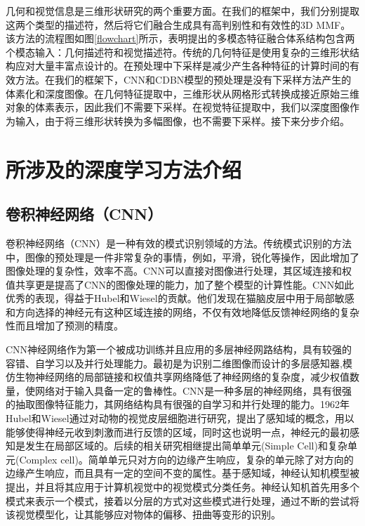 几何和视觉信息是三维形状研究的两个重要方面。在我们的框架中，我们分别提取这两个类型的描述符，然后将它们融合生成具有高判别性和有效性的3D MMF。该方法的流程图如图\ref{flowchart}所示，表明提出的多模态特征融合体系结构包含两个模态输入：几何描述符和视觉描述符。传统的几何特征是使用复杂的三维形状结构应对大量丰富点设计的。在预处理中下采样是减少产生各种特征的计算时间的有效方法。在我们的框架下，CNN和CDBN模型的预处理是没有下采样方法产生的体素化和深度图像。在几何特征提取中，三维形状从网格形式转换成接近原始三维对象的体素表示，因此我们不需要下采样。在视觉特征提取中，我们以深度图像作为输入，由于将三维形状转换为多幅图像，也不需要下采样。接下来分步介绍。


\section{所涉及的深度学习方法介绍}

\subsection{卷积神经网络（CNN）}

卷积神经网络（CNN）是一种有效的模式识别领域的方法。传统模式识别的方法中，图像的预处理是一件非常复杂的事情，例如，平滑，锐化等操作，因此增加了图像处理的复杂性，效率不高。CNN可以直接对图像进行处理，其区域连接和权值共享更是提高了CNN的图像处理的能力，加了整个模型的计算性能。CNN如此优秀的表现，得益于Hubel和Wiesel的贡献。他们发现在猫脑皮层中用于局部敏感和方向选择的神经元有这种区域连接的网络，不仅有效地降低反馈神经网络的复杂性而且增加了预测的精度。


CNN神经网络作为第一个被成功训练并且应用的多层神经网路结构，具有较强的容错、自学习以及并行处理能力。最初是为识别二维图像而设计的多层感知器,模仿生物神经网络的局部链接和权值共享网络降低了神经网络的复杂度，减少权值数量，使网络对于输入具备一定的鲁棒性。CNN是一种多层的神经网络，具有很强的抽取图像特征能力，其网络结构具有很强的自学习和并行处理的能力。1962年Hubel和Wiesel通过对动物的视觉皮层细胞进行研究，提出了感知域的概念，用以能够使得神经元收到刺激而进行反馈的区域，同时这也说明一点，神经元的最初感知是发生在局部区域的。后续的相关研究相继提出简单单元(Simple Cell)和复杂单元(Complex cell)。简单单元只对方向的边缘产生响应，复杂的单元除了对方向的边缘产生响应，而且具有一定的空间不变的属性。基于感知域，神经认知机模型被提出，并且将其应用于计算机视觉中的视觉模式分类任务。神经认知机首先用多个模式来表示一个模式，接着以分层的方式对这些模式进行处理，通过不断的尝试将该视觉模型化，让其能够应对物体的偏移、扭曲等变形的识别。

